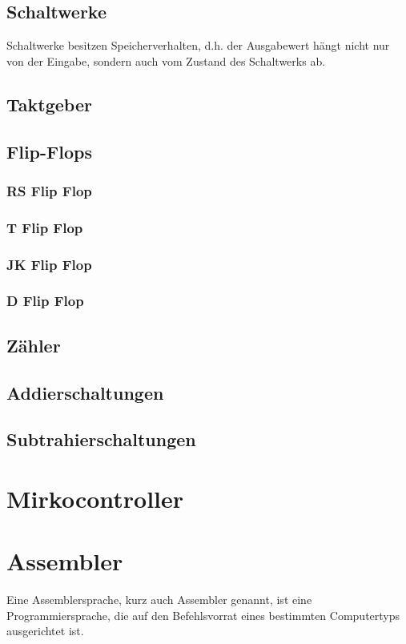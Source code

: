 \documentclass[12pt,a4paper]{article}
\begin{document}
\subsection{Schaltwerke}
Schaltwerke besitzen Speicherverhalten, d.h. der Ausgabewert hängt nicht nur von der Eingabe, sondern auch vom Zustand des Schaltwerks ab.
\subsection{Taktgeber}
\subsection{Flip-Flops}
\subsubsection{RS Flip Flop}
\subsubsection{T Flip Flop}
\subsubsection{JK Flip Flop}
\subsubsection{D Flip Flop}
\subsection{Zähler}
\subsection{Addierschaltungen}
\subsection{Subtrahierschaltungen}
\section{Mirkocontroller}
\section{Assembler}
Eine Assemblersprache, kurz auch Assembler genannt, ist eine Programmiersprache, die auf den Befehlsvorrat eines bestimmten Computertyps ausgerichtet ist.
\end{document}
